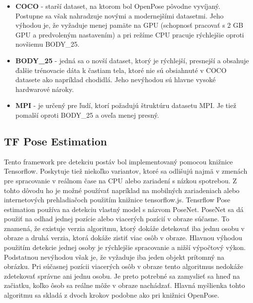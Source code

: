 \documentclass[slovak,master,dept460,male,cpp,cpdeclaration]{diploma}
\begin{document}
\begin{itemize}
\item \textbf{COCO} - starší dataset, na ktorom bol OpenPose pôvodne vyvíjaný. Postupne sa však nahradzuje novými a modernejšími datasetmi. Jeho výhodou je, že vyžaduje menej pamäte na GPU (schopnosť pracovať s 2 GB GPU a predvoleným nastavením) a pri režíme CPU pracuje rýchlejšie oproti novšiemu BODY\_25.

\item \textbf{BODY\_25} - jedná sa o novší dataset, ktorý je rýchlejší, presnejší a obsahuje ďalšie trénovacie dáta k častiam tela, ktoré nie sú obsiahnuté v COCO datasete ako napríklad chodidlá. Jeho nevýhodou sú hlavne vysoké hardwarové nároky.

\item \textbf{MPI} - je určený pre ľudí, ktorí požadujú štruktúru datasetu MPI. Je tiež pomalší oproti BODY\_25 a oveľa menej presný.
\end{itemize}




\newpage
\subsection{TF Pose Estimation}
Tento framework pre detekciu postáv bol implementovaný pomocou knižnice Tensorflow. Poskytuje tiež niekoľko variantov, ktoré sa odlišujú najmä v zmenách pre spracovanie v reálnom čase na CPU alebo zariadení s nízkou spotrebou. Z tohto dôvodu ho je  možné používať napríklad na mobilných zariadeniach alebo internetových prehladiačoch použitím knižnice tensorflow.js. Tensrflow Pose estimation používa na detekciu  vlastný model s názvom PoseNet. PoseNet sa dá použiť na odhad jednej pozície alebo viacerých pozícií v obraze súčasne. To znamená, že existuje verzia algoritmu, ktorý dokáže detekovať iba jednu osobu v obraze a druhá verzia, ktorá dokáže zistiť viac osôb v obraze. Hlavnou výhodou použitím detekcie jednej osoby je rýchlejšie spracovanie a nižší výpočtový výkon. Podstatnou nevýhodou však je, že vyžaduje iba jeden objekt prítomný na obrázku. Pri súčasnej pozícii viacerých osôb v obraze tento algoritmus nedokáže zdetekovať správne ani jednu osobu. Je preto potrebné sa zamyslieť sa  hneď na začiatku, koľko ôsob sa reálne môže v obraze nachádzať. Hlavná myšlienka tohto algoritmu sa skladá z dvoch krokov podobne ako pri knižnici OpenPose.
\end{document}
